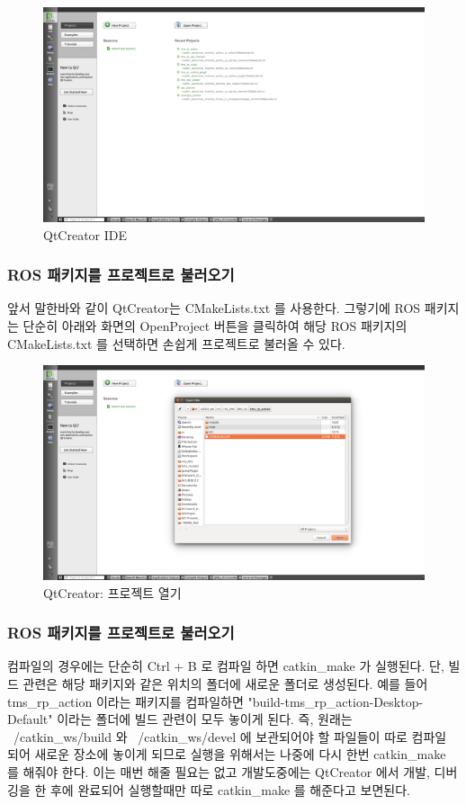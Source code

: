 \begin{figure}[h]
\centering\includegraphics[width=0.8\columnwidth]{pictures/chapter2/qtcreator1.png}
\caption{QtCreator IDE}
\end{figure}

\subsubsection{ROS 패키지를 프로젝트로 불러오기}
앞서 말한바와 같이 QtCreator는 CMakeLists.txt 를 사용한다. 그렇기에 ROS 패키지는 단순히 아래와 화면의 OpenProject 버튼을 클릭하여 해당 ROS 패키지의 CMakeLists.txt 를 선택하면 손쉽게 프로젝트로 불러올 수 있다.

\begin{figure}[h]
\centering\includegraphics[width=0.8\columnwidth]{pictures/chapter2/qtcreator2.png}
\caption{QtCreator: 프로젝트 열기}
\end{figure}

\subsubsection{ROS 패키지를 프로젝트로 불러오기}
컴파일의 경우에는 단순히 Ctrl + B 로 컴파일 하면 catkin\_make 가 실행된다. 단, 빌드 관련은 해당 패키지와 같은 위치의 폴더에 새로운 폴더로 생성된다. 예를 들어 tms\_rp\_action 이라는 패키지를 컴파일하면 "build-tms\_rp\_action-Desktop-Default" 이라는 폴더에 빌드 관련이 모두 놓이게 된다. 즉,  원래는 ~/catkin\_ws/build 와 ~/catkin\_ws/devel 에 보관되어야 할 파일들이 따로 컴파일 되어 새로운 장소에 놓이게 되므로 실행을 위해서는 나중에 다시 한번 catkin\_make 를 해줘야 한다. 이는 매번 해줄 필요는 없고 개발도중에는 QtCreator 에서 개발, 디버깅을 한 후에 완료되어 실행할때만 따로 catkin\_make 를 해준다고 보면된다. 

